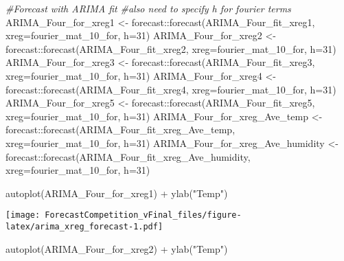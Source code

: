 \documentclass[
]{article}
\newenvironment{Shaded}{\begin{snugshade}}{\end{snugshade}}
\newcommand{\AttributeTok}[1]{\textcolor[rgb]{0.77,0.63,0.00}{#1}}
\newcommand{\CommentTok}[1]{\textcolor[rgb]{0.56,0.35,0.01}{\textit{#1}}}
\newcommand{\DecValTok}[1]{\textcolor[rgb]{0.00,0.00,0.81}{#1}}
\newcommand{\FunctionTok}[1]{\textcolor[rgb]{0.00,0.00,0.00}{#1}}
\newcommand{\NormalTok}[1]{#1}
\newcommand{\OtherTok}[1]{\textcolor[rgb]{0.56,0.35,0.01}{#1}}
\newcommand{\SpecialCharTok}[1]{\textcolor[rgb]{0.00,0.00,0.00}{#1}}
\newcommand{\StringTok}[1]{\textcolor[rgb]{0.31,0.60,0.02}{#1}}
\begin{document}
\begin{Shaded}
\begin{Highlighting}[]
\CommentTok{\#Forecast with ARIMA fit}
\CommentTok{\#also need to specify h for fourier terms}
\NormalTok{ARIMA\_Four\_for\_xreg1 }\OtherTok{\textless{}{-}}\NormalTok{ forecast}\SpecialCharTok{::}\FunctionTok{forecast}\NormalTok{(ARIMA\_Four\_fit\_xreg1, }\AttributeTok{xreg=}\NormalTok{fourier\_mat\_10\_for, }\AttributeTok{h=}\DecValTok{31}\NormalTok{) }
\NormalTok{ARIMA\_Four\_for\_xreg2 }\OtherTok{\textless{}{-}}\NormalTok{ forecast}\SpecialCharTok{::}\FunctionTok{forecast}\NormalTok{(ARIMA\_Four\_fit\_xreg2, }\AttributeTok{xreg=}\NormalTok{fourier\_mat\_10\_for, }\AttributeTok{h=}\DecValTok{31}\NormalTok{) }
\NormalTok{ARIMA\_Four\_for\_xreg3 }\OtherTok{\textless{}{-}}\NormalTok{ forecast}\SpecialCharTok{::}\FunctionTok{forecast}\NormalTok{(ARIMA\_Four\_fit\_xreg3, }\AttributeTok{xreg=}\NormalTok{fourier\_mat\_10\_for, }\AttributeTok{h=}\DecValTok{31}\NormalTok{) }
\NormalTok{ARIMA\_Four\_for\_xreg4 }\OtherTok{\textless{}{-}}\NormalTok{ forecast}\SpecialCharTok{::}\FunctionTok{forecast}\NormalTok{(ARIMA\_Four\_fit\_xreg4, }\AttributeTok{xreg=}\NormalTok{fourier\_mat\_10\_for, }\AttributeTok{h=}\DecValTok{31}\NormalTok{) }
\NormalTok{ARIMA\_Four\_for\_xreg5 }\OtherTok{\textless{}{-}}\NormalTok{ forecast}\SpecialCharTok{::}\FunctionTok{forecast}\NormalTok{(ARIMA\_Four\_fit\_xreg5, }\AttributeTok{xreg=}\NormalTok{fourier\_mat\_10\_for, }\AttributeTok{h=}\DecValTok{31}\NormalTok{) }
\NormalTok{ARIMA\_Four\_for\_xreg\_Ave\_temp }\OtherTok{\textless{}{-}}\NormalTok{ forecast}\SpecialCharTok{::}\FunctionTok{forecast}\NormalTok{(ARIMA\_Four\_fit\_xreg\_Ave\_temp, }\AttributeTok{xreg=}\NormalTok{fourier\_mat\_10\_for, }\AttributeTok{h=}\DecValTok{31}\NormalTok{) }
\NormalTok{ARIMA\_Four\_for\_xreg\_Ave\_humidity }\OtherTok{\textless{}{-}}\NormalTok{ forecast}\SpecialCharTok{::}\FunctionTok{forecast}\NormalTok{(ARIMA\_Four\_fit\_xreg\_Ave\_humidity, }\AttributeTok{xreg=}\NormalTok{fourier\_mat\_10\_for, }\AttributeTok{h=}\DecValTok{31}\NormalTok{) }

\FunctionTok{autoplot}\NormalTok{(ARIMA\_Four\_for\_xreg1) }\SpecialCharTok{+} \FunctionTok{ylab}\NormalTok{(}\StringTok{"Temp"}\NormalTok{)}
\end{Highlighting}
\end{Shaded}

\texttt{[image: ForecastCompetition\_vFinal\_files/figure-latex/arima\_xreg\_forecast-1.pdf]}

\begin{Shaded}
\begin{Highlighting}[]
\FunctionTok{autoplot}\NormalTok{(ARIMA\_Four\_for\_xreg2) }\SpecialCharTok{+} \FunctionTok{ylab}\NormalTok{(}\StringTok{"Temp"}\NormalTok{)}
\end{Highlighting}
\end{Shaded}
\end{document}
